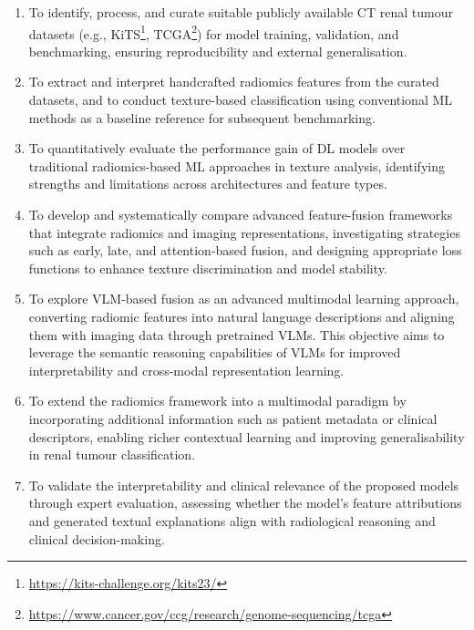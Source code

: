 \documentclass[final,british,a4paper,12pt]{phdthesis}
\begin{document}
\begin{enumerate}
\item To identify, process, and curate suitable publicly available CT renal tumour datasets (e.g., KiTS\footnote{\href{https://kits-challenge.org/kits23/}{https://kits-challenge.org/kits23/}}, TCGA\footnote{\href{https://www.cancer.gov/ccg/research/genome-sequencing/tcga}{https://www.cancer.gov/ccg/research/genome-sequencing/tcga}}) for model training, validation, and benchmarking, ensuring reproducibility and external generalisation.


\item To extract and interpret handcrafted radiomics features from the curated datasets, and to conduct texture-based classification using conventional ML methods as a baseline reference for subsequent benchmarking.

\item To quantitatively evaluate the performance gain of DL models over traditional radiomics-based ML approaches in texture analysis, identifying strengths and limitations across architectures and feature types.

\item To develop and systematically compare advanced feature-fusion frameworks that integrate radiomics and imaging representations, investigating strategies such as early, late, and attention-based fusion, and designing appropriate loss functions to enhance texture discrimination and model stability.

\item To explore VLM-based fusion as an advanced multimodal learning approach, converting radiomic features into natural language descriptions and aligning them with imaging data through pretrained VLMs. This objective aims to leverage the semantic reasoning capabilities of VLMs for improved interpretability and cross-modal representation learning.

\item To extend the radiomics framework into a multimodal paradigm by incorporating additional information such as patient metadata or clinical descriptors, enabling richer contextual learning and improving generalisability in renal tumour classification.

\item To validate the interpretability and clinical relevance of the proposed models through expert evaluation, assessing whether the model’s feature attributions and generated textual explanations align with radiological reasoning and clinical decision-making.

\end{enumerate}
\end{document}
